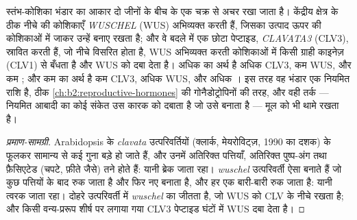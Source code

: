 \begin{proposition}[स्तंभ कोशिकाएँ बनाए रखना: एक प्रतिपुष्टि चक्र]\label{prop:b2:plant-meristems:wus}
स्तंभ-कोशिका भंडार का आकार दो जीनों के बीच के एक चक्र से अचर रखा जाता
है। केंद्रीय क्षेत्र के ठीक नीचे की कोशिकाएँ
 \emph{WUSCHEL} (WUS) अभिव्यक्त करती हैं, जिसका उत्पाद ऊपर
की कोशिकाओं में जाकर उन्हें  बनाए रखता है; और वे  बदले में एक छोटा पेप्टाइड, \emph{CLAVATA3} (CLV3), स्रावित
करती हैं, जो नीचे विसरित होता है, WUS अभिव्यक्त करती कोशिकाओं में किसी
ग्राही काइनेज़ (CLV1) से बँधता है और WUS को दबा देता है। अधिक  का अर्थ है अधिक CLV3, कम WUS, और कम ; और कम  का अर्थ है कम CLV3, अधिक WUS, और अधिक
। इस तरह वह भंडार एक नियमित राशि है, ठीक
\cref{ch:b2:reproductive-hormones} की गोनैडोट्रोपिनों की तरह, और वही
तर्क --- नियमित आबादी का कोई संकेत उस कारक को दबाता है जो उसे बनाता है
--- मूल  को भी थामे रखता है।
\end{proposition}
\begin{proof}[प्रमाण-सामग्री]
Arabidopsis के \emph{clavata} उत्परिवर्तियों (क्लार्क,
मेयरोविट्ज़, 1990 का दशक) के  फूलकर सामान्य से कई गुना बड़े हो
जाते हैं, और उनमें अतिरिक्त पत्तियाँ, अतिरिक्त पुष्प-अंग तथा फ़ैसिएटेड
(चपटे, फ़ीते जैसे) तने होते हैं: यानी ब्रेक जाता रहा। \emph{wuschel}
उत्परिवर्ती ऐसा  बनाते हैं जो कुछ पत्तियों के बाद रुक जाता है
और फिर नए बनाता है, और हर एक बारी-बारी रुक जाता है: यानी त्वरक जाता
रहा। दोहरे उत्परिवर्ती में \emph{wuschel} का  जीतता है, जो
WUS को CLV के नीचे रखता है; और किसी वन्य-प्ररूप शीर्ष पर लगाया गया CLV3
पेप्टाइड घंटों में WUS दबा देता है।
\end{proof}

